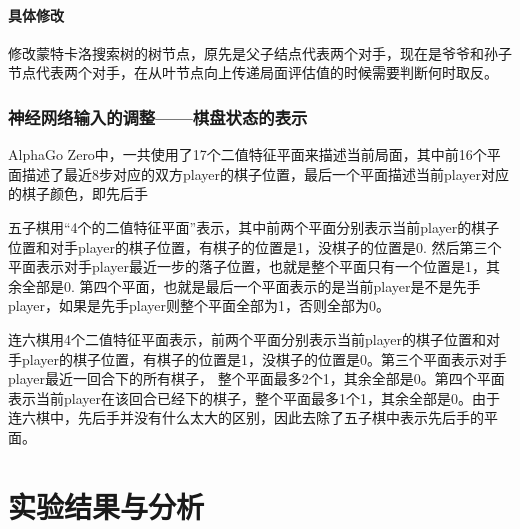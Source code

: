 \documentclass[c5size]{ctexart}
\begin{document}
		\paragraph{具体修改}修改蒙特卡洛搜索树的树节点，原先是父子结点代表两个对手，现在是爷爷和孙子节点代表两个对手，在从叶节点向上传递局面评估值的时候需要判断何时取反。
	\subsubsection{神经网络输入的调整——棋盘状态的表示}
		AlphaGo Zero中，一共使用了17个二值特征平面来描述当前局面，其中前16个平面描述了最近8步对应的双方player的棋子位置，最后一个平面描述当前player对应的棋子颜色，即先后手
		
		五子棋用“4个的二值特征平面”表示，其中前两个平面分别表示当前player的棋子位置和对手player的棋子位置，有棋子的位置是1，没棋子的位置是0. 然后第三个平面表示对手player最近一步的落子位置，也就是整个平面只有一个位置是1，其余全部是0. 第四个平面，也就是最后一个平面表示的是当前player是不是先手player，如果是先手player则整个平面全部为1，否则全部为0。
		
		连六棋用4个二值特征平面表示，前两个平面分别表示当前player的棋子位置和对手player的棋子位置，有棋子的位置是1，没棋子的位置是0。第三个平面表示对手player最近一回合下的所有棋子， 整个平面最多2个1，其余全部是0。第四个平面表示当前player在该回合已经下的棋子，整个平面最多1个1，其余全部是0。由于连六棋中，先后手并没有什么太大的区别，因此去除了五子棋中表示先后手的平面。

\section{实验结果与分析}
\end{document}
